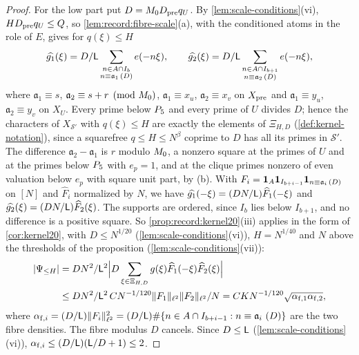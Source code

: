 \begin{proof}
For the low part put $D=M_0 D_{\rm pre}q_U$. By
\cref{lem:scale-conditions}(vi), $HD_{\rm pre}q_U\le Q$, so
\cref{lem:record:fibre-scale}(a), with the conditioned atoms in the role of
$E$, gives for $q(\xi)\le H$
\[
 \widehat{g_1}(\xi)=D/\mathsf L\sum_{\substack{n\in A\cap I_b\\ n\equiv\mathfrak a_1\,(D)}}e(-n\xi),
 \qquad
 \widehat{g_2}(\xi)=D/\mathsf L\sum_{\substack{n\in A\cap I_{b+1}\\ n\equiv\mathfrak a_2\,(D)}}e(-n\xi),
\]
where $\mathfrak a_1\equiv s$, $\mathfrak a_2\equiv s+r\pmod{M_0}$, $\mathfrak a_1\equiv x_u$,
$\mathfrak a_2\equiv x_v$ on $X_{\rm pre}$ and $\mathfrak a_1\equiv y_u$, $\mathfrak a_2\equiv y_v$ on $X_U$.
Every prime below $P_5$ and every prime of $U$ divides $D$; hence the
characters of $X_{\mathcal S'}$ with $q(\xi)\le H$ are exactly the elements
of $\Xi_{H,D}$ (\cref{def:kernel-notation}), since a squarefree $q\le H\le N^\beta$ coprime to $D$ has all
its primes in $\mathcal S'$. The difference $\mathfrak a_2-\mathfrak a_1$ is $r$ modulo $M_0$,
a nonzero square at the primes of $U$ and at the primes below $P_5$ with
$e_p=1$, and at the clique primes nonzero of even valuation below $e_p$ with
square unit part, by (b). With
$F_i=\mathbf 1_A\mathbf 1_{I_{b+i-1}}\mathbf 1_{n\equiv\mathfrak a_i\,(D)}$ on $[N]$ and $\widehat F_i$
normalized by $N$, we have $\widehat{g_1}(-\xi)=(DN/\mathsf L)\widehat F_1(-\xi)$ and
$\widehat{g_2}(\xi)=(DN/\mathsf L)\widehat F_2(\xi)$. The supports are ordered,
since $I_b$ lies below $I_{b+1}$, and no difference is a positive square. So
\cref{prop:record:kernel20}(iii) applies in the form of \cref{cor:kernel20}, with
$D\le N^{1/20}$ (\cref{lem:scale-conditions}(vi)), $H=N^{1/40}$ and
$N$ above the thresholds of the proposition (\cref{lem:scale-conditions}(vii)):
\begin{align*}
 |\Psi_{\le H}|&=DN^2/\mathsf L^2\Big|D\sum_{\xi\in\Xi_{H,D}}g(\xi)
 \widehat F_1(-\xi)\widehat F_2(\xi)\Big|\\
 &\le DN^2/\mathsf L^2\,C N^{-1/120}\|F_1\|_{\ell^2}\|F_2\|_{\ell^2}/N
 =CK N^{-1/120}\sqrt{\alpha_{{\rm f},1}\alpha_{{\rm f},2}},
\end{align*}
where
$\alpha_{{\rm f},i}=(D/\mathsf L)\|F_i\|_{\ell^2}^2=(D/\mathsf L)\#\{n\in A\cap I_{b+i-1}:n\equiv\mathfrak a_i\ (D)\}$
are the two fibre densities. The fibre modulus $D$ cancels. Since
$D\le\mathsf L$ (\cref{lem:scale-conditions}(vi)),
$\alpha_{{\rm f},i}\le(D/\mathsf L)(\mathsf L/D+1)\le2$.


\end{proof}
